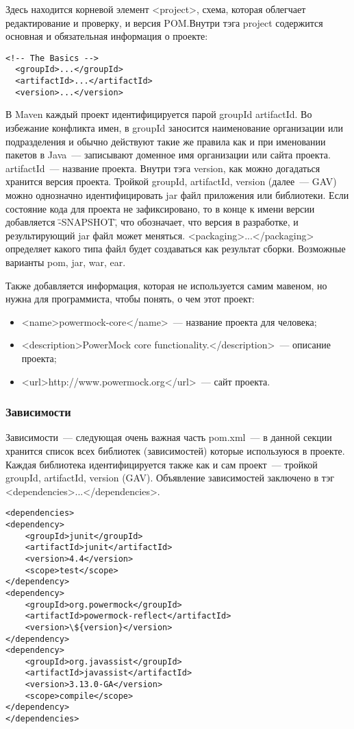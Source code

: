 Здесь находится корневой элемент <project>, схема, которая облегчает редактирование и проверку, и версия POM.Внутри тэга project содержится основная и обязательная информация о проекте:

\begin{lstlisting}
<!-- The Basics -->
  <groupId>...</groupId>
  <artifactId>...</artifactId>
  <version>...</version>
\end{lstlisting}

В Maven каждый проект идентифицируется парой groupId artifactId. Во избежание конфликта имен, в groupId заносится наименование организации или подразделения и обычно действуют такие же правила как и при именовании пакетов в Java~--- записывают доменное имя организации или сайта проекта. artifactId~--- название проекта. Внутри тэга version, как можно догадаться хранится версия проекта. Тройкой groupId, artifactId, version (далее~--- GAV) можно однозначно идентифицировать jar файл приложения или библиотеки. Если состояние кода для проекта не зафиксировано, то в конце к имени версии добавляется \"-SNAPSHOT\", что обозначает, что версия в разработке, и результирующий jar файл может меняться. <packaging>...</packaging> определяет какого типа файл будет создаваться как результат сборки. Возможные варианты pom, jar, war, ear.

Также добавляется информация, которая не используется самим мавеном, но нужна для программиста, чтобы понять, о чем этот проект:
\begin{itemize}
\item<name>powermock-core</name>~--- название проекта для человека;
\item<description>PowerMock core functionality.</description>~--- описание проекта;
\item<url>http://www.powermock.org</url>~--- сайт проекта.
\end{itemize}

\subsubsection{Зависимости}
Зависимости~--- следующая очень важная часть pom.xml~--- в данной секции хранится список всех библиотек (зависимостей) которые используюся в проекте. Каждая библиотека идентифицируется также как и сам проект~--- тройкой groupId, artifactId, version (GAV). Объявление зависимостей заключено в тэг <dependencies>...</dependencies>.

\begin{lstlisting}
<dependencies>
<dependency>
    <groupId>junit</groupId>
    <artifactId>junit</artifactId>
    <version>4.4</version>
    <scope>test</scope>
</dependency>
<dependency>
    <groupId>org.powermock</groupId>
    <artifactId>powermock-reflect</artifactId>
    <version>\${version}</version>
</dependency>
<dependency>
    <groupId>org.javassist</groupId>
    <artifactId>javassist</artifactId>
    <version>3.13.0-GA</version>
    <scope>compile</scope>
</dependency>
</dependencies>
\end{lstlisting}

